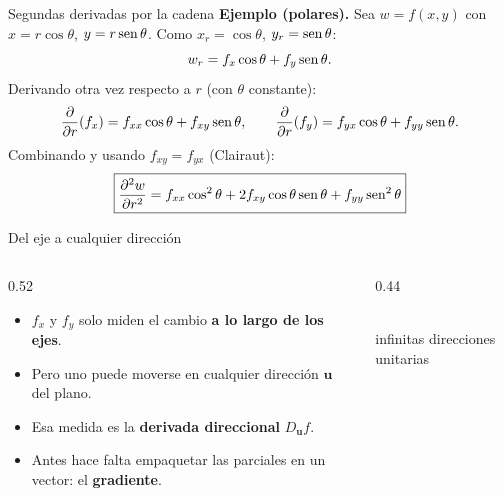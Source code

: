 \documentclass[11pt,aspectratio=169]{beamer}
\begin{document}
\begin{frame}{Segundas derivadas por la cadena}
  \pause
  \vspace{4pt}
  \textbf{Ejemplo (polares).} Sea $w=f(x,y)$ con $x=r\cos\theta$, $y=r\operatorname{sen}\theta$. Como $x_r=\cos\theta$, $y_r=\operatorname{sen}\theta$:
  \[
    w_r=f_x\cos\theta+f_y\operatorname{sen}\theta.
  \]
  \pause
  Derivando otra vez respecto a $r$ (con $\theta$ constante):
  \[
    \frac{\partial}{\partial r}(f_x)=f_{xx}\cos\theta+f_{xy}\operatorname{sen}\theta,
    \qquad
    \frac{\partial}{\partial r}(f_y)=f_{yx}\cos\theta+f_{yy}\operatorname{sen}\theta.
  \]
  \pause
  Combinando y usando $f_{xy}=f_{yx}$ (Clairaut):
  \[
    \boxed{\frac{\partial^2w}{\partial r^2}=f_{xx}\cos^2\theta+2f_{xy}\cos\theta\operatorname{sen}\theta+f_{yy}\operatorname{sen}^2\theta}
  \]
\end{frame}


\begin{frame}{Del eje a cualquier dirección}
  \begin{columns}
    \begin{column}{0.52\textwidth}
      \begin{itemize}
        \item $f_x$ y $f_y$ solo miden el cambio \textbf{a lo largo de los ejes}.
        \pause
        \item Pero uno puede moverse en cualquier dirección $\mathbf u$ del plano.
        \pause
        \item Esa medida es la \textbf{derivada direccional} $D_{\mathbf u}f$.
        \pause
        \item Antes hace falta empaquetar las parciales en un vector: el \textbf{gradiente}.
      \end{itemize}
    \end{column}
    \begin{column}{0.44\textwidth}
      \centering
      \\[4pt]
      {\footnotesize\color{gray60} infinitas direcciones unitarias}
    \end{column}
  \end{columns}
\end{frame}
\end{document}
